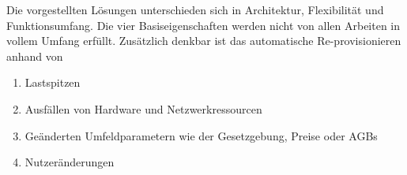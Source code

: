 Die vorgestellten Lösungen unterschieden sich in Architektur, Flexibilität und Funktionsumfang. Die vier Basiseigenschaften werden nicht von allen Arbeiten in vollem Umfang erfüllt. Zusätzlich denkbar ist das automatische Re-provisionieren anhand von 

\begin{enumerate}
	\item Lastspitzen
	\item Ausfällen von Hardware und Netzwerkressourcen
	\item Geänderten Umfeldparametern wie der Gesetzgebung, Preise oder AGBs
	\item Nutzeränderungen
\end{enumerate}